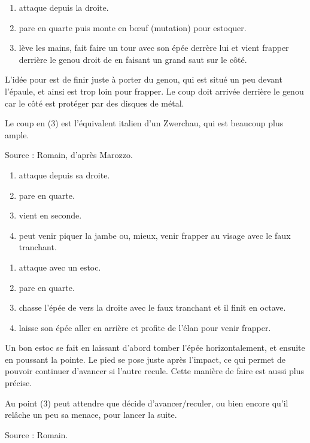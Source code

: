 \begin{technique}

\begin{enumerate}
	\item \A attaque depuis la droite.
	\item \D pare en quarte puis monte en bœuf (mutation) pour estoquer.
	\item \A lève les mains, fait faire un tour avec son épée derrère lui et vient frapper derrière le genou droit de \D en faisant un grand saut sur le côté.
\end{enumerate}

L'idée pour \A est de finir juste à porter du genou, qui est situé un peu devant l'épaule, et ainsi \D est trop loin pour frapper.
Le coup doit arrivée derrière le genou car le côté est protéger par des disques de métal.

Le coup en (3) est l'équivalent italien d'un Zwerchau, qui est beaucoup plus ample.

Source : Romain, d'après Marozzo.

\end{technique}


\begin{technique}

\begin{enumerate}
	\item \A attaque depuis sa droite.
	\item \D pare en quarte.
	\item \D vient en seconde.
	\item \D peut venir piquer la jambe ou, mieux, venir frapper au visage avec le faux tranchant.
\end{enumerate}

\end{technique}


\begin{technique}

\begin{enumerate}
	\item \A attaque avec un estoc.
	\item \D pare en quarte.
	\item \D chasse l'épée de \A vers la droite avec le faux tranchant et il finit en octave.
	\item \D laisse son épée aller en arrière et profite de l'élan pour venir frapper.
\end{enumerate}

Un bon estoc se fait en laissant d'abord tomber l'épée horizontalement, et ensuite en poussant la pointe.
Le pied se pose juste après l'impact, ce qui permet de pouvoir continuer d'avancer si l'autre recule.
Cette manière de faire est aussi plus précise.

Au point (3) \D peut attendre que \A décide d'avancer/reculer, ou bien encore qu'il relâche un peu sa menace, pour lancer la suite.

Source : Romain.

\end{technique}


